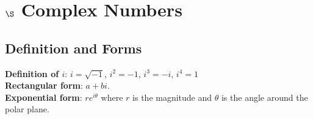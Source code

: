 \section{$\S$ Complex Numbers}
\subsection{Definition and Forms}

\textbf{Definition of $i$}: $i = \sqrt{-1}$, $i^2 = -1$, $i^3 = -i$, $i^4 = 1$ \\
\textbf{Rectangular form}: $a+bi$. \\
\textbf{Exponential form}: $re^{i\theta}$ where $r$ is the magnitude and $\theta$ is the angle around the polar plane.

